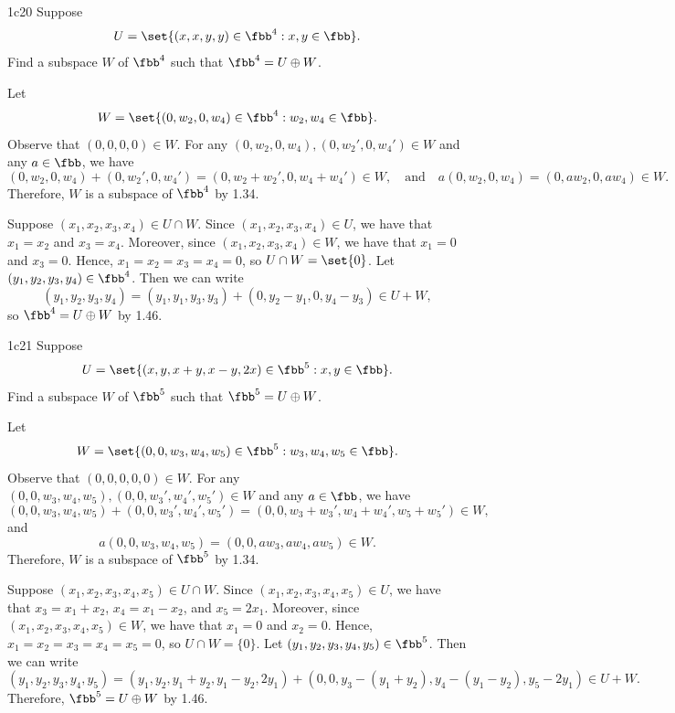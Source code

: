 \begin{exercise}{1c20}
    Suppose
    \[
    	U = \set{(x, x, y, y) \in \fbb^4 : x, y \in \fbb}.
    \]
    Find a subspace $W$ of $\fbb^4$ such that $\fbb^4 = U \oplus W$.
\end{exercise}

\begin{sol}
    Let
    \[
        W = \set{(0, w_2, 0, w_4) \in \fbb^4 : w_2, w_4 \in \fbb}.
    \]
    Observe that $(0, 0, 0, 0) \in W$.
    For any $(0, w_2, 0, w_4), (0, w_2', 0, w_4') \in W$ and any $a \in \fbb$, we have
    \[
        (0, w_2, 0, w_4) + (0, w_2', 0, w_4') = (0, w_2 + w_2', 0, w_4 + w_4') \in W, \quad \text{and} \quad a(0, w_2, 0, w_4) = (0, aw_2, 0, aw_4) \in W.
    \]
    Therefore, $W$ is a subspace of $\fbb^4$ by 1.34.

    Suppose $(x_1, x_2, x_3, x_4) \in U \cap W$.
    Since $(x_1, x_2, x_3, x_4) \in U$, we have that $x_1 = x_2$ and $x_3 = x_4$.
    Moreover, since $(x_1, x_2, x_3, x_4) \in W$, we have that $x_1 = 0$ and $x_3 = 0$.
    Hence, $x_1 = x_2 = x_3 = x_4 = 0$, so $U \cap W = \set{0}$.
    Let $(y_1, y_2, y_3, y_4) \in \fbb^4$.
    Then we can write
    \[
        (y_1, y_2, y_3, y_4) = (y_1, y_1, y_3, y_3) + (0, y_2 - y_1, 0, y_4 - y_3) \in U + W,
    \]
    so $\fbb^4 = U \oplus W$ by 1.46.
\end{sol}

\begin{exercise}{1c21}
    Suppose
    \[
    	U = \set{(x, y, x + y, x - y, 2x) \in \fbb^5 : x, y \in \fbb}.
    \]
    Find a subspace $W$ of $\fbb^5$ such that $\fbb^5 = U \oplus W$.
\end{exercise}

\begin{sol}
    Let
    \[
        W = \set{(0, 0, w_3, w_4, w_5) \in \fbb^5 : w_3, w_4, w_5 \in \fbb}.
    \]
    Observe that $(0, 0, 0, 0, 0) \in W$.
    For any $(0, 0, w_3, w_4, w_5), (0, 0, w_3', w_4', w_5') \in W$ and any $a \in \fbb$, we have
    \[
        (0, 0, w_3, w_4, w_5) + (0, 0, w_3', w_4', w_5') = (0, 0, w_3 + w_3', w_4 + w_4', w_5 + w_5') \in W,
    \]
    and
    \[
        a(0, 0, w_3, w_4, w_5) = (0, 0, aw_3, aw_4, aw_5) \in W.
    \]
    Therefore, $W$ is a subspace of $\fbb^5$ by 1.34.

    Suppose $(x_1, x_2, x_3, x_4, x_5) \in U \cap W$.
    Since $(x_1, x_2, x_3, x_4, x_5) \in U$, we have that $x_3 = x_1 + x_2$, $x_4 = x_1 - x_2$, and $x_5 = 2x_1$.
    Moreover, since $(x_1, x_2, x_3, x_4, x_5) \in W$, we have that $x_1 = 0$ and $x_2 = 0$.
    Hence, $x_1 = x_2 = x_3 = x_4 = x_5 = 0$, so $U \cap W = \{0\}$.
    Let $(y_1, y_2, y_3, y_4, y_5) \in \fbb^5$.
    Then we can write
    \[
        (y_1, y_2, y_3, y_4, y_5) = (y_1, y_2, y_1 + y_2, y_1 - y_2, 2y_1) + (0, 0, y_3 - (y_1 + y_2), y_4 - (y_1 - y_2), y_5 - 2y_1) \in U + W.
    \]
    Therefore, $\fbb^5 = U \oplus W$ by 1.46.
\end{sol}

